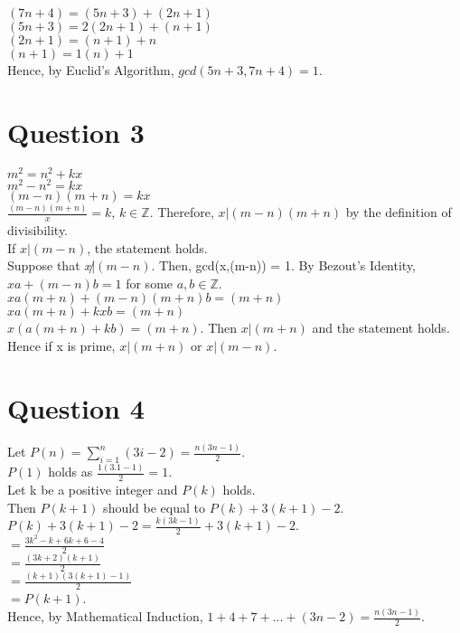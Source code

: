 \documentclass[12pt]{article}
\begin{document}
    $(7n+4) = (5n+3) + (2n+1)$\\
    $(5n+3) = 2(2n+1) + (n+1) $\\
    $(2n+1) = (n+1) + n$ \\
    $(n+1) = 1(n) + 1  $\\
    Hence, by Euclid's Algorithm, $gcd(5n+3, 7n+4) = 1.$


\section*{Question 3}
    
    $m^2 = n^2 + kx$\\
    $m^2 - n^2 = kx$\\
    $(m-n)(m+n) = kx$\\
    $\frac{(m-n)(m+n)}{x} = k$, $k \in \mathbb{Z}$. Therefore, $x|(m-n)(m+n)$ by the definition of divisibility.\\
    If $x | (m-n)$, the statement holds.\\
    Suppose that $x \not| (m-n)$.
    Then, gcd(x,(m-n)) = 1. By Bezout's Identity,\\
    $xa + (m-n)b = 1$ for some $a,b \in \mathbb{Z}$. \\
    $xa(m+n) + (m-n)(m+n)b = (m+n)$\\
    $xa(m+n) + kxb = (m+n)$\\
    $x ( a(m+n)+kb) = (m+n)$. Then $x|(m+n)$ and the statement holds.\\
    Hence if x is prime, $x|(m+n)$ or $x|(m-n)$.
    
    
    
    

\section*{Question 4}
    
    Let $P(n) = \sum_{i=1}^{n}(3i-2) = \frac{n(3n-1)}{2}.$\\
    $P(1)$ holds as $\frac{1(3.1-1)}{2} = 1$.\\
    Let k be a positive integer and $P(k)$ holds.\\
    Then $P(k+1)$ should be equal to $ P(k) + 3(k+1)-2$.\\
    $P(k) + 3(k+1)-2 = \frac{k(3k-1)}{2} + 3(k+1)-2$.\\
    $= \frac{3k^2-k+6k+6-4}{2}$\\
    $= \frac{(3k+2)(k+1)}{2}$\\
    $= \frac{(k+1)(3(k+1)-1)}{2}$\\
    $= P(k+1)$.\\
    Hence, by Mathematical Induction, $1+4+7+...+(3n-2) = \frac{n(3n-1)}{2}$.
    
    
\end{document}
